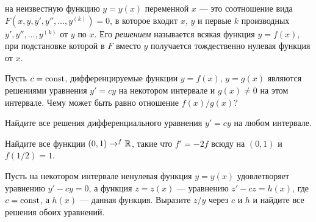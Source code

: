 \documentclass[a4paper, 12pt]{article}
\begin{document}









  на неизвестную функцию $y=y(x)$ переменной $x$ --- это соотношение
  вида $F(x,y,y',y'',\ldots,y^{(k)})=0$, в которое входит $x$, $y$ и
  первые $k$ производных $y',y'',\ldots,y^{(k)}$ от $y$ по $x$. Его
  {\it решением\/} называется всякая функция $y=f(x)$, при подстановке
  которой в $F$ вместо $y$ получается тождественно нулевая функция от
  $x$.














  Пусть $c=\operatorname{const}$, дифференцируемые функции $y=f(x)$, $y=g(x)$
  являются решениями уравнения $y'=cy$ на некотором
  интервале и $g(x)\ne 0$ на этом интервале. Чему может быть
  равно отношение $f(x)/g(x)$?














  Найдите все решения дифференциального уравнения $y'=cy$ на любом
  интервале.














  Найдите все функции $(0,1)\rightarrow^f\mathbb{R}$, такие что
  $f'=-2f$ всюду на $(0,1)$ и $f(1/2)=1$.














  Пусть на некотором интервале ненулевая функция $y=y(x)$ удовлетворяет
  уравнению $y'-cy=0$, а функция $z=z(x)$ --- уравнению $z'-cz=h(x)$,
  где $c=\operatorname{const}$, а $h(x)$ --- данная функция. Выразите $z/y$ через
  $c$ и $h$ и найдите все решения обоих уравнений.
\end{document}
